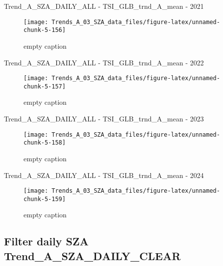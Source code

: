 \documentclass[
  10pt,
  a4paper,oneside]{article}
\begin{document}
Trend\_A\_SZA\_DAILY\_ALL - TSI\_GLB\_trnd\_A\_mean - 2021

\begin{figure}[!ht]

{\centering \texttt{[image: Trends\_A\_03\_SZA\_data\_files/figure-latex/unnamed-chunk-5-156]} 

}

\caption{ empty caption }\label{fig:unnamed-chunk-5-156}
\end{figure}

Trend\_A\_SZA\_DAILY\_ALL - TSI\_GLB\_trnd\_A\_mean - 2022

\begin{figure}[!ht]

{\centering \texttt{[image: Trends\_A\_03\_SZA\_data\_files/figure-latex/unnamed-chunk-5-157]} 

}

\caption{ empty caption }\label{fig:unnamed-chunk-5-157}
\end{figure}

Trend\_A\_SZA\_DAILY\_ALL - TSI\_GLB\_trnd\_A\_mean - 2023

\begin{figure}[!ht]

{\centering \texttt{[image: Trends\_A\_03\_SZA\_data\_files/figure-latex/unnamed-chunk-5-158]} 

}

\caption{ empty caption }\label{fig:unnamed-chunk-5-158}
\end{figure}

Trend\_A\_SZA\_DAILY\_ALL - TSI\_GLB\_trnd\_A\_mean - 2024

\begin{figure}[!ht]

{\centering \texttt{[image: Trends\_A\_03\_SZA\_data\_files/figure-latex/unnamed-chunk-5-159]} 

}

\caption{ empty caption }\label{fig:unnamed-chunk-5-159}
\end{figure}

\FloatBarrier

\hypertarget{filter-daily-sza-trend_a_sza_daily_clear}{%
\subsection{Filter daily SZA Trend\_A\_SZA\_DAILY\_CLEAR}\label{filter-daily-sza-trend_a_sza_daily_clear}}
\end{document}
